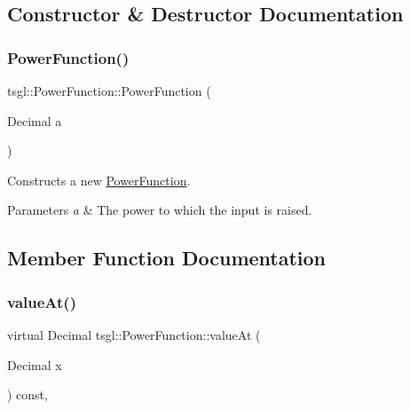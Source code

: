 \subsection{Constructor \& Destructor Documentation}
\mbox{\label{classtsgl_1_1_power_function_a0a5d692e9bc9cf2a176ecab4ffc06519}} 
\subsubsection{\texorpdfstring{Power\+Function()}{PowerFunction()}}
{\footnotesize\ttfamily tsgl\+::\+Power\+Function\+::\+Power\+Function (\begin{DoxyParamCaption}\item[{Decimal}]{a }\end{DoxyParamCaption})\hspace{0.3cm}{\ttfamily [inline]}}



Constructs a new \hyperlink{classtsgl_1_1_power_function}{Power\+Function}. 


\begin{DoxyParams}{Parameters}
{\em a} & The power to which the input is raised. \\
\hline
\end{DoxyParams}


\subsection{Member Function Documentation}
\mbox{\label{classtsgl_1_1_power_function_a1dfcce604dd60b033969807f6312b074}} 
\subsubsection{\texorpdfstring{value\+At()}{valueAt()}}
{\footnotesize\ttfamily virtual Decimal tsgl\+::\+Power\+Function\+::value\+At (\begin{DoxyParamCaption}\item[{Decimal}]{x }\end{DoxyParamCaption}) const\hspace{0.3cm}{\ttfamily [inline]}, {\ttfamily [virtual]}}



